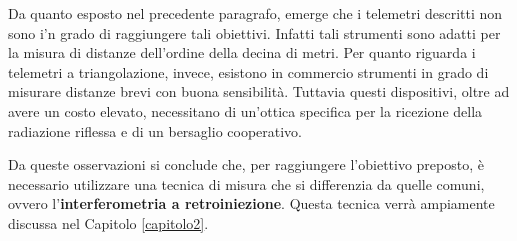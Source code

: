 Da quanto esposto nel precedente paragrafo, emerge che i telemetri descritti non sono i'n grado di raggiungere tali obiettivi. Infatti tali strumenti sono adatti per la misura di distanze dell'ordine della decina di metri. Per quanto riguarda i telemetri a triangolazione, invece, esistono in commercio strumenti in grado di misurare distanze brevi con buona sensibilità. Tuttavia questi dispositivi, oltre ad avere un costo elevato, necessitano di un'ottica specifica per la ricezione della radiazione riflessa e di un bersaglio cooperativo.

Da queste osservazioni si conclude che, per raggiungere l'obiettivo preposto, è necessario utilizzare una tecnica di misura che si differenzia da quelle comuni, ovvero l'\textbf{interferometria a retroiniezione}. Questa tecnica verrà ampiamente discussa nel Capitolo \ref{capitolo2}.











 







